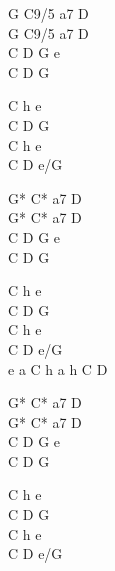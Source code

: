 \begin{chord}
\ifOneCol \else \small{ \fi
G C9/5 a7 D\\
G C9/5 a7 D\\
C D G e\\
C D G

C h e\\
C D G\\
C h e\\
C D e/G

G* C* a7 D\\
G* C* a7 D\\
C D G e\\
C D G

C h e\\
C D G\\
C h e\\
C D e/G\\
e a C h a h C D

G* C* a7 D\\
G* C* a7 D\\
C D G e\\
C D G

C h e\\
C D G\\
C h e\\
C D e/G
\ifOneCol \else } \fi
\end{chord}

